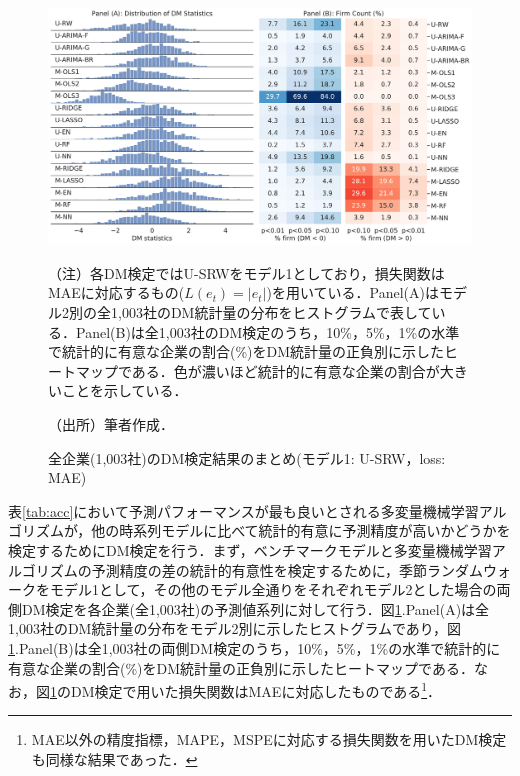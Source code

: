 \documentclass[a4paper，11pt]{jsarticle}
\begin{document}
\begin{figure}[bp]
  \centering
  \caption{全企業(1,003社)のDM検定結果のまとめ(モデル1: U-SRW，loss: MAE)}
  \label{fig:dm_srw}
  \includegraphics[width=\linewidth]{./img/_dm_MAD_y_hat_srw.pdf}
  \begin{threeparttable}
  \begin{tablenotes}
    \item[]（注）各DM検定ではU-SRWをモデル1としており，損失関数はMAEに対応するもの($L(e_t)=|e_t|$)を用いている．Panel(A)はモデル2別の全1,003社のDM統計量の分布をヒストグラムで表している．Panel(B)は全1,003社のDM検定のうち，10\%，5\%，1\%の水準で統計的に有意な企業の割合(\%)をDM統計量の正負別に示したヒートマップである．色が濃いほど統計的に有意な企業の割合が大きいことを示している．
    \item[]（出所）筆者作成．
  \end{tablenotes}
  \end{threeparttable}
\end{figure}

表\ref{tab:acc}において予測パフォーマンスが最も良いとされる多変量機械学習アルゴリズムが，他の時系列モデルに比べて統計的有意に予測精度が高いかどうかを検定するためにDM検定を行う．まず，ベンチマークモデルと多変量機械学習アルゴリズムの予測精度の差の統計的有意性を検定するために，季節ランダムウォークをモデル1として，その他のモデル全通りをそれぞれモデル2とした場合の両側DM検定を各企業(全1,003社)の予測値系列に対して行う．図\ref{fig:dm_srw}.Panel(A)は全1,003社のDM統計量の分布をモデル2別に示したヒストグラムであり，図\ref{fig:dm_srw}.Panel(B)は全1,003社の両側DM検定のうち，10\%，5\%，1\%の水準で統計的に有意な企業の割合(\%)をDM統計量の正負別に示したヒートマップである．なお，図\ref{fig:dm_srw}のDM検定で用いた損失関数はMAEに対応したものである\footnote{MAE以外の精度指標，MAPE，MSPEに対応する損失関数を用いたDM検定も同様な結果であった．}．
\end{document}
